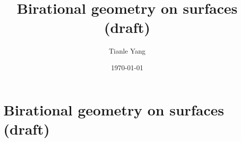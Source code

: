 \documentclass{noteformyself}
\title{Birational geometry on surfaces (draft)}
\author{Tianle Yang}
\date{\today}
\begin{document}
    \maketitle

    \section{Birational geometry on surfaces (draft)}


\end{document}
